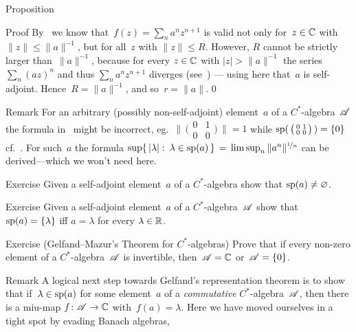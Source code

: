 \documentclass[a]{subfiles}
\begin{document}
\begin{parsec}
\begin{point}{Proposition}
\begin{point}{Proof}
By~
we know that~$f(z)=\sum_n a^nz^{n+1}$
is valid not only for~$z\in \mathbb{C}$ with $\|z\|\leq \|a\|^{-1}$,
but for all~$z$ with $\|z\|\leq R$.
However, $R$ cannot be strictly larger than~$\|a\|^{-1}$,
because for every $z\in\mathbb{C}$ with $\left|z\right|>\|a\|^{-1}$
the series $\sum_n(az)^n$ 
and thus $\sum_n a^n{z}^{n+1}$ diverges (see~)
--- using here that~$a$ is self-adjoint.
Hence~$R=\|a\|^{-1}$, and so~$r=\|a\|$.\qed
\end{point}
\end{point}
\begin{point}{Remark}%
For an arbitrary (possibly non-self-adjoint)
element~$a$ of a $C^*$-algebra~$\mathscr{A}$
the formula in~
might be incorrect, eg.~$\bigl\|\,\bigl(\begin{smallmatrix}
0& 1\\
0 & 0
\end{smallmatrix}\bigr)\,\|=1$
while 
$\mathrm{sp}(\,\bigl(\begin{smallmatrix}
0& 1\\
0 & 0
\end{smallmatrix}\bigr)\,)=\{0\}$
cf.~.
For such~$a$
the formula
$\sup\{\,\left|\lambda\right|\colon\, \lambda\in \mathrm{sp}(a)\,\}
\,=\, \limsup_n \|a^n\|^{\nicefrac{1}{n}}$
can be derived---which we won't need here.
\end{point}
\begin{point}{Exercise}%
Given a self-adjoint element~$a$ of a $C^*$-algebra show that
$\mathrm{sp}(a)\neq \varnothing$.
\end{point}
\begin{point}{Exercise}%
Given a self-adjoint element~$a$ of a $C^*$-algebra~$\mathscr{A}$
show that $\mathrm{sp}(a) =\{\lambda\}$ iff $a=\lambda$ for every $\lambda \in\mathbb{R}$.
\end{point}
\begin{point}{Exercise (Gelfand--Mazur's Theorem for $C^*$-algebras)}%
Prove that if every non-zero element of a $C^*$-algebra~$\mathscr{A}$
is invertible, then~$\mathscr{A}=\mathbb{C}$ or~$\mathscr{A}=\{0\}$.
\end{point}
\begin{point}{Remark}%
A logical next step
towards Gelfand's representation theorem
is to show that if~$\lambda\in\mathrm{sp}(a)$
for some element~$a$ of a \emph{commutative} $C^*$-algebra~$\mathscr{A}$,
then there is a miu-map $f\colon \mathscr{A}\to \mathbb{C}$
with~$f(a)=\lambda$.
Here we have moved ourselves in a tight spot
by evading Banach algebras,

\end{point}
\end{parsec}
\end{document}
